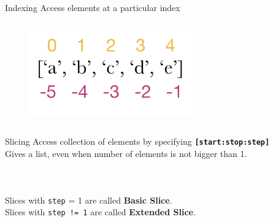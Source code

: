         \begin{frame}{Indexing}
            \LARGE
            Access elements at a particular index
            \begin{columns}
            \begin{column}{0.5\textwidth}
                \vspace{-5mm}
                \begin{figure}[H]
                    \bigskip
                    \includegraphics[width=70mm]{../Lecture3/code-examples/index.png}
                    \end{figure}    
            \end{column}
            \begin{column}{0.5\textwidth}
                \inputminted[frame=single,framesep=2pt, lastline=8]{python3}{../Lecture3/code-examples/index.py}
            \end{column} 
            \end{columns}
        \end{frame}

        \begin{frame}{Slicing}
            \LARGE
            Access collection of elements by specifying \textbf{\texttt{[start:stop:step]}}\\
            Gives a list, even when number of elements is not bigger than 1.
            \normalsize
            \vspace{-2mm}
            \begin{columns}
                \begin{column}{0.5\textwidth}
                    \inputminted[frame=single,framesep=2pt,lastline=9]{python3}{../Review1/code-examples/slicing.py}                        
                \end{column}                
                \begin{column}{0.5\textwidth}
                    \inputminted[frame=single,framesep=2pt,firstline=10]{python3}{../Review1/code-examples/slicing.py}                                
                \end{column}
            \end{columns}
            \vspace{2mm}
            \LARGE
            Slices with \texttt{step} = 1 are called \textbf{Basic Slice}.\\
            Slices with \texttt{step != 1} are called \textbf{Extended Slice}.
        \end{frame}

